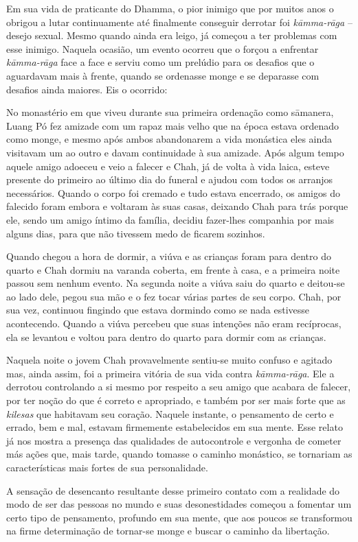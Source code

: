 Em sua vida de praticante do Dhamma, o pior inimigo que por muitos anos
o obrigou a lutar continuamente até finalmente conseguir derrotar foi
\emph{kāmma-rāga} -- desejo sexual. Mesmo quando ainda era leigo, já
começou a ter problemas com esse inimigo. Naquela ocasião, um evento
ocorreu que o forçou a enfrentar \emph{kāmma-rāga} face a face e serviu
como um prelúdio para os desafios que o aguardavam mais à frente, quando
se ordenasse monge e se deparasse com desafios ainda maiores. Eis o
ocorrido:

No monastério em que viveu durante sua primeira ordenação como sāmanera,
Luang Pó fez amizade com um rapaz mais velho que na época estava
ordenado como monge, e mesmo após ambos abandonarem a vida monástica
eles ainda visitavam um ao outro e davam continuidade à sua amizade.
Após algum tempo aquele amigo adoeceu e veio a falecer e Chah, já de
volta à vida laica, esteve presente do primeiro ao último dia do funeral
e ajudou com todos os arranjos necessários. Quando o corpo foi cremado e
tudo estava encerrado, os amigos do falecido foram embora e voltaram às
suas casas, deixando Chah para trás porque ele, sendo um amigo íntimo da
família, decidiu fazer-lhes companhia por mais alguns dias, para que não
tivessem medo de ficarem sozinhos.

Quando chegou a hora de dormir, a viúva e as crianças foram para dentro
do quarto e Chah dormiu na varanda coberta, em frente à casa, e a
primeira noite passou sem nenhum evento. Na segunda noite a viúva saiu
do quarto e deitou-se ao lado dele, pegou sua mão e o fez tocar várias
partes de seu corpo. Chah, por sua vez, continuou fingindo que estava
dormindo como se nada estivesse acontecendo. Quando a viúva percebeu que
suas intenções não eram recíprocas, ela se levantou e voltou para dentro
do quarto para dormir com as crianças.

Naquela noite o jovem Chah provavelmente sentiu-se muito confuso e
agitado mas, ainda assim, foi a primeira vitória de sua vida contra
\emph{kāmma-rāga}. Ele a derrotou controlando a si mesmo por respeito a
seu amigo que acabara de falecer, por ter noção do que é correto e
apropriado, e também por ser mais forte que as \emph{kilesas} que
habitavam seu coração. Naquele instante, o pensamento de certo e errado,
bem e mal, estavam firmemente estabelecidos em sua mente. Esse relato já
nos mostra a presença das qualidades de autocontrole e vergonha de
cometer más ações que, mais tarde, quando tomasse o caminho monástico,
se tornariam as características mais fortes de sua personalidade.

A sensação de desencanto resultante desse primeiro contato com a
realidade do modo de ser das pessoas no mundo e suas desonestidades
começou a fomentar um certo tipo de pensamento, profundo em sua mente,
que aos poucos se transformou na firme determinação de tornar-se monge e
buscar o caminho da libertação.

